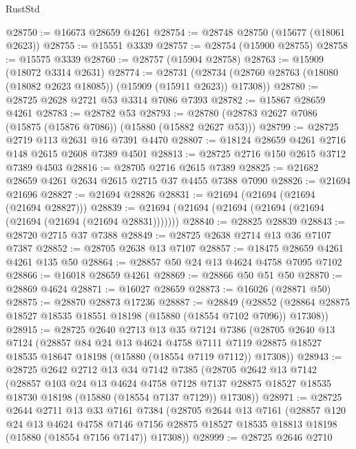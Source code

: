 \begin{lexlean}{RustStd}
\begin{coremodule}
@28750 := @16673 @28659 @4261
@28754 := @28748 @28750 (@15677 (@18061 @2623))
@28755 := @15551 @3339
@28757 := @28754 (@15900 @28755)
@28758 := @15575 @3339
@28760 := @28757 (@15904 @28758)
@28763 := @15909 (@18072 @3314 @2631)
@28774 := @28731
    (@28734 (@28760 @28763 (@18080 (@18082 @2623 @18085)) (@15909 (@15911 @2623)) @17308))
@28780 := @28725 @2628 @2721 @53 @3314 @7086 @7393
@28782 := @15867 @28659 @4261
@28783 := @28782 @53
@28793 := @28780 (@28783 @2627 @7086 (@15875 (@15876 @7086)) (@15880 (@15882 @2627 @53)))
@28799 := @28725 @2719 @113 @2631 @16 @7391 @4470
@28807 := @18124 @28659 @4261 @2716 @148 @2615 @2608 @7389 @4501
@28813 := @28725 @2716 @150 @2615 @3712 @7389 @4503
@28816 := @28705 @2716 @2615 @7389
@28825 := @21682 @28659 @4261 @2634 @2615 @2715 @37 @4455 @7388 @7090
@28826 := @21694 @21696
@28827 := @21694 @28826
@28831 := @21694 (@21694 (@21694 (@21694 @28827)))
@28839 := @21694 (@21694 (@21694 (@21694 (@21694 (@21694 (@21694 (@21694 @28831)))))))
@28840 := @28825 @28839
@28843 := @28720 @2715 @37 @7388
@28849 := @28725 @2638 @2714 @13 @36 @7107 @7387
@28852 := @28705 @2638 @13 @7107
@28857 := @18475 @28659 @4261 @4261 @135 @50
@28864 := @28857 @50 @24 @13 @4624 @4758 @7095 @7102
@28866 := @16018 @28659 @4261
@28869 := @28866 @50 @51 @50
@28870 := @28869 @4624
@28871 := @16027 @28659
@28873 := @16026 (@28871 @50)
@28875 := @28870 @28873 @17236
@28887 := @28849
    (@28852 (@28864 @28875 @18527 @18535 @18551 @18198 (@15880 (@18554 @7102 @7096)) @17308))
@28915 := @28725
    @2640
    @2713
    @13
    @35
    @7124
    @7386
    (@28705
      @2640
      @13
      @7124
      (@28857
        @84
        @24
        @13
        @4624
        @4758
        @7111
        @7119
        @28875
        @18527
        @18535
        @18647
        @18198
        (@15880 (@18554 @7119 @7112))
        @17308))
@28943 := @28725
    @2642
    @2712
    @13
    @34
    @7142
    @7385
    (@28705
      @2642
      @13
      @7142
      (@28857
        @103
        @24
        @13
        @4624
        @4758
        @7128
        @7137
        @28875
        @18527
        @18535
        @18730
        @18198
        (@15880 (@18554 @7137 @7129))
        @17308))
@28971 := @28725
    @2644
    @2711
    @13
    @33
    @7161
    @7384
    (@28705
      @2644
      @13
      @7161
      (@28857
        @120
        @24
        @13
        @4624
        @4758
        @7146
        @7156
        @28875
        @18527
        @18535
        @18813
        @18198
        (@15880 (@18554 @7156 @7147))
        @17308))
@28999 := @28725
    @2646
    @2710

\end{coremodule}
\end{lexlean}
